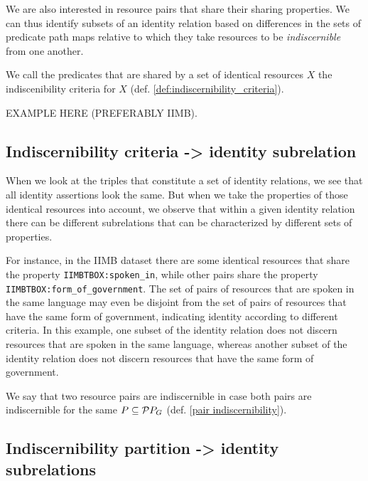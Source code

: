 We are also interested in resource pairs that share their sharing properties.
We can thus identify subsets of an identity relation based on differences
  in the sets of predicate path maps relative to which they take resources
  to be \emph{indiscernible} from one another.


We call the predicates that are shared by a set of identical resources $X$
  the indiscenibility criteria for $X$
  (def. \ref{def:indiscernibility_criteria}).

EXAMPLE HERE (PREFERABLY IIMB).

\begin{comment}
Drawing:
<s,p,o1>
<s,p,o2>
<o1,=,o2>
From IIMB data.
\end{comment}

\subsection{Indiscernibility criteria -> identity subrelation}

When we look at the triples that constitute a set of identity relations,
  we see that all identity assertions look the same.
But when we take the properties of those identical resources into account,
  we observe that within a given identity relation there can be different
  subrelations that can be characterized by different sets of properties.

For instance, in the IIMB dataset there are some identical resources that
  share the property \verb|IIMBTBOX:spoken_in|, while other pairs share
  the property \verb|IIMBTBOX:form_of_government|.
The set of pairs of resources that are spoken in the same language may even
  be disjoint from the set of pairs of resources that have the same
  form of government, indicating identity according to different criteria.
In this example, one subset of the identity relation does not discern
  resources that are spoken in the same language, whereas another subset
  of the identity relation does not discern resources that have the same
  form of government.

We say that two resource pairs are indiscernible
  in case both pairs are indiscernible for the same
  $P \subseteq \mathcal{P}{P_G}$
  (def. \ref{pair indiscernibility}).

\subsection{Indiscernibility partition -> identity subrelations}

